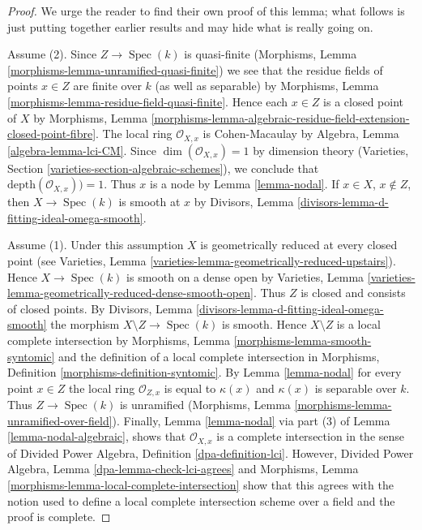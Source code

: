 \documentclass{stacks-project}
\theoremstyle{plain}
\theoremstyle{definition}
\theoremstyle{remark}
\numberwithin{equation}{subsection}
\def\Spec{\mathop{\mathrm{Spec}}}
\begin{document}
\begin{proof}
We urge the reader to find their own proof of
this lemma; what follows is just putting together earlier results
and may hide what is really going on.

\medskip\noindent
Assume (2). Since $Z \to \Spec(k)$ is quasi-finite
(Morphisms, Lemma \ref{morphisms-lemma-unramified-quasi-finite})
we see that the residue fields of points $x \in Z$ are finite
over $k$ (as well as separable) by
Morphisms, Lemma \ref{morphisms-lemma-residue-field-quasi-finite}.
Hence each $x \in Z$ is a closed point of $X$ by
Morphisms, Lemma
\ref{morphisms-lemma-algebraic-residue-field-extension-closed-point-fibre}.
The local ring $\mathcal{O}_{X, x}$ is Cohen-Macaulay by
Algebra, Lemma \ref{algebra-lemma-lci-CM}.
Since $\dim(\mathcal{O}_{X, x}) = 1$ by dimension theory
(Varieties, Section \ref{varieties-section-algebraic-schemes}), we conclude
that $\text{depth}(\mathcal{O}_{X, x})) = 1$. Thus $x$ is a node
by Lemma \ref{lemma-nodal}. If $x \in X$, $x \not \in Z$, then
$X \to \Spec(k)$ is smooth at $x$ by
Divisors, Lemma \ref{divisors-lemma-d-fitting-ideal-omega-smooth}.

\medskip\noindent
Assume (1). Under this assumption $X$ is geometrically reduced
at every closed point (see
Varieties, Lemma \ref{varieties-lemma-geometrically-reduced-upstairs}).
Hence $X \to \Spec(k)$ is smooth on a dense open by
Varieties, Lemma \ref{varieties-lemma-geometrically-reduced-dense-smooth-open}.
Thus $Z$ is closed and consists of closed points.
By Divisors, Lemma \ref{divisors-lemma-d-fitting-ideal-omega-smooth}
the morphism $X \setminus Z \to \Spec(k)$ is smooth.
Hence $X \setminus Z$ is a local complete intersection by
Morphisms, Lemma \ref{morphisms-lemma-smooth-syntomic}
and the definition of a local complete intersection in
Morphisms, Definition \ref{morphisms-definition-syntomic}.
By Lemma \ref{lemma-nodal} for every point $x \in Z$
the local ring $\mathcal{O}_{Z, x}$ is equal to $\kappa(x)$
and $\kappa(x)$ is separable over $k$. Thus $Z \to \Spec(k)$
is unramified (Morphisms, Lemma \ref{morphisms-lemma-unramified-over-field}).
Finally, Lemma \ref{lemma-nodal} via part (3) of
Lemma \ref{lemma-nodal-algebraic}, shows that $\mathcal{O}_{X, x}$
is a complete intersection in the sense of
Divided Power Algebra, Definition \ref{dpa-definition-lci}.
However, Divided Power Algebra, Lemma \ref{dpa-lemma-check-lci-agrees}
and Morphisms, Lemma \ref{morphisms-lemma-local-complete-intersection}
show that this agrees with the notion used to define a local
complete intersection scheme over a field and the proof is complete.
\end{proof}
\end{document}
